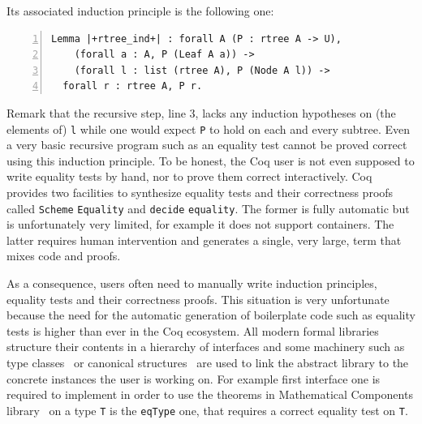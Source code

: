\documentclass[sigplan,10pt,review]{acmart}\settopmatter{printfolios=true,printccs=false,printacmref=false}
\begin{document}
\noindent
Its associated induction principle is the following one:

\begin{minipage}{\textwidth}\begin{lstlisting}[numbers=left]
Lemma |+rtree_ind+| : forall A (P : rtree A -> U),
    (forall a : A, P (Leaf A a)) ->
    (forall l : list (rtree A), P (Node A l)) ->
  forall r : rtree A, P r.
\end{lstlisting}\end{minipage}

Remark that the recursive step, line 3, lacks any induction hypotheses
on (the elements of) \lstinline+l+ while one would expect
\lstinline+P+ to hold on each and every subtree. Even a very basic
recursive program such as an equality test cannot be proved correct
using this induction principle.
To be honest, the Coq
user is not even supposed to write equality tests by hand, nor to prove
them correct interactively.  Coq provides two facilities to synthesize
equality tests and their correctness proofs called 
\lstinline+Scheme+ \lstinline+Equality+ and
\lstinline+decide+ \lstinline+equality+. 
The former is fully
automatic but is unfortunately very limited, for example it does not support
containers.  The latter requires human intervention 
and generates a single, very large, term that mixes code and proofs.

As a consequence, %
users often need to manually write induction principles,
equality tests and their correctness proofs.
This situation is very unfortunate because the need for the automatic
generation of boilerplate code such as equality tests
is higher than ever in the Coq ecosystem.
All modern formal libraries structure their contents in a
hierarchy of interfaces and some machinery such as type
classes~\cite{Sozeau:2008:FTC:1459784.1459810} or
canonical structures~\cite{10.1007/978-3-642-39634-2_5}
are used to link the abstract library to the
concrete instances the user is working on.
For example first interface one
is required to implement in order to use the theorems in Mathematical
Components library~\cite{mcb} on a type \lstinline+T+ is the \lstinline+eqType+
one, that requires a correct equality test on \lstinline+T+.

\end{document}
